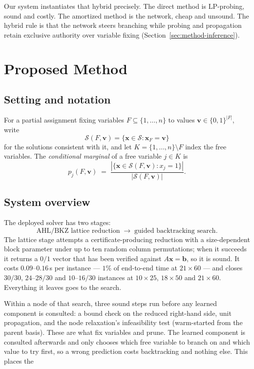 \documentclass[preprint,12pt]{elsarticle}
\newcommand{\SOL}{\mathcal{S}}
\begin{document}
Our system instantiates that hybrid precisely. The direct method is LP-probing, sound and costly. The amortized method is the network, cheap and unsound. The hybrid rule is that the network steers branching while probing and propagation retain exclusive authority over variable fixing (Section~\ref{sec:method-inference}).

\section{Proposed Method}
\label{sec:method}

\subsection{Setting and notation}

For a partial assignment fixing variables $F\subseteq\{1,\dots,n\}$ to values $\mathbf{v}\in\{0,1\}^{|F|}$, write
\begin{equation}
\SOL(F,\mathbf{v}) = \{\mathbf{x}\in\SOL : \mathbf{x}_F=\mathbf{v}\}
\end{equation}
for the solutions consistent with it, and let $K=\{1,\dots,n\}\setminus F$ index the free variables. The \emph{conditional marginal} of a free variable $j\in K$ is
\begin{equation}
p_j(F,\mathbf{v}) \;=\; \frac{|\{\mathbf{x}\in\SOL(F,\mathbf{v}) : x_j=1\}|}{|\SOL(F,\mathbf{v})|}.
\label{eq:condmarg}
\end{equation}

\subsection{System overview}
\label{sec:method-cascade}

The deployed solver has two stages:
\begin{equation}
\text{AHL/BKZ lattice reduction} \;\to\; \text{guided backtracking search}.
\end{equation}
The lattice stage attempts a certificate-producing reduction with a size-dependent block parameter under up to ten random column permutations; when it succeeds it returns a $0/1$ vector that has been verified against $A\mathbf{x}=\mathbf{b}$, so it is sound. It costs $0.09$--$0.16$\,s per instance --- $1\%$ of end-to-end time at $21\times60$ --- and closes $30/30$, $24$--$28/30$ and $10$--$16/30$ instances at $10\times25$, $18\times50$ and $21\times60$. Everything it leaves goes to the search.

Within a node of that search, three sound steps run before any learned component is consulted: a bound check on the reduced right-hand side, unit propagation, and the node relaxation's infeasibility test (warm-started from the parent basis). These are what fix variables and prune. The learned component is consulted afterwards and only chooses which free variable to branch on and which value to try first, so a wrong prediction costs backtracking and nothing else. This places the
\end{document}
